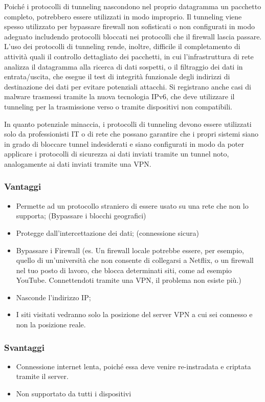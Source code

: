 Poiché i protocolli di tunneling nascondono nel proprio datagramma un pacchetto completo, potrebbero essere utilizzati in modo improprio. Il tunneling viene spesso utilizzato per bypassare firewall non sofisticati o non configurati in modo adeguato includendo protocolli bloccati nei protocolli che il firewall lascia passare. L'uso dei protocolli di tunneling rende, inoltre, difficile il completamento di attività quali il controllo dettagliato dei pacchetti, in cui l'infrastruttura di rete analizza il datagramma alla ricerca di dati sospetti, o il filtraggio dei dati in entrata/uscita, che esegue il test di integrità funzionale degli indirizzi di destinazione dei dati per evitare potenziali attacchi. Si registrano anche casi di malware trasmessi tramite la nuova tecnologia IPv6, che deve utilizzare il tunneling per la trasmissione verso o tramite dispositivi non compatibili.

In quanto potenziale minaccia, i protocolli di tunneling devono essere utilizzati solo da professionisti IT o di rete che possano garantire che i propri sistemi siano in grado di bloccare tunnel indesiderati e siano configurati in modo da poter applicare i protocolli di sicurezza ai dati inviati tramite un tunnel noto, analogamente ai dati inviati tramite una VPN.

\subsubsection{Vantaggi}
\begin{itemize}
    \item Permette ad un protocollo straniero di essere usato su una rete che non lo supporta; (Bypassare i blocchi geografici)
    \item Protegge dall'intercettazione dei dati; (connessione sicura)
    \item Bypassare i Firewall (es. Un firewall locale potrebbe essere, per esempio, quello di un’università che non consente di collegarsi a Netflix, o un firewall nel tuo posto di lavoro, che blocca determinati siti, come ad esempio YouTube. Connettendoti tramite una VPN, il problema non esiste più.)
    \item Nasconde l’indirizzo IP;
    \item I siti visitati vedranno solo la posizione del server VPN a cui sei connesso e non la posizione reale.
\end{itemize}

\subsubsection{Svantaggi}
\begin{itemize}
    \item Connessione internet lenta, poiché essa deve venire re-instradata e criptata tramite il server.
    \item Non supportato da tutti i dispositivi
\end{itemize}

